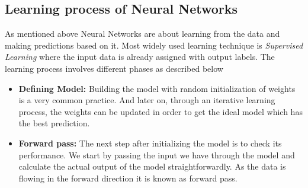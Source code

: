 \subsection{Learning process of Neural Networks}
As mentioned above Neural Networks are about learning from the data and making predictions based on it. Most widely used learning technique is \textit{Supervised Learning} where the input data is already assigned with output labels. The learning process involves different phases as described below
\begin{itemize}
    \item \textbf{Defining Model:} Building the model with random initialization of weights is a very common practice. And later on, through an iterative learning process, the weights can be updated in order to get the ideal model which has the best prediction.
      \item \textbf{Forward pass:} The next step after initializing the model is to check its performance. We start by passing the input we have through the model and calculate the actual output of the model straightforwardly. As the data is flowing in the forward direction it is known as forward pass.
 

\end{itemize}
